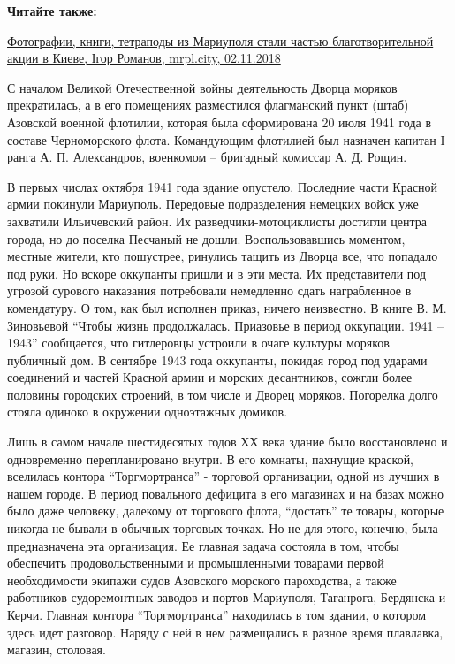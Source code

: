\textbf{Читайте также:} 

\href{https://mrpl.city/news/view/fotografii-knigi-tetrapody-iz-mariupolya-stali-chastyu-blagotvoritelnoj-aktsii-v-kieve-foto}{%
Фотографии, книги, тетраподы из Мариуполя стали частью благотворительной акции в Киеве, Ігор Романов, mrpl.city, 02.11.2018}

С началом Великой Отечественной войны деятельность Дворца моряков
прекратилась, а в его помещениях разместился флагманский пункт (штаб) Азовской
военной флотилии, которая была сформирована 20 июля 1941 года в составе
Черноморского флота. Командующим флотилией был назначен капитан I ранга А. П.
Александров, военкомом – бригадный комиссар А. Д. Рощин.

В первых числах октября 1941 года здание опустело. Последние части Красной
армии покинули Мариуполь. Передовые подразделения немецких войск уже захватили
Ильичевский район. Их разведчики-мотоциклисты достигли центра города, но до
поселка Песчаный не дошли. Воспользовавшись моментом, местные жители, кто
пошустрее, ринулись тащить из Дворца все, что попадало под руки. Но вскоре
оккупанты пришли и в эти места. Их представители под угрозой сурового наказания
потребовали немедленно сдать награбленное в комендатуру. О том, как был
исполнен приказ, ничего неизвестно. В книге В. М. Зиновьевой \enquote{Чтобы жизнь
продолжалась. Приазовье в период оккупации. 1941 – 1943} сообщается, что
гитлеровцы устроили в очаге культуры моряков публичный дом. В сентябре 1943
года оккупанты, покидая город под ударами соединений и частей Красной армии и
морских десантников, сожгли более половины городских строений, в том числе и
Дворец моряков. Погорелка долго стояла одиноко в окружении одноэтажных домиков.

Лишь в самом начале шестидесятых годов ХХ века здание было восстановлено и
одновременно перепланировано внутри. В его комнаты, пахнущие краской, вселилась
контора \enquote{Торгмортранса} - торговой организации, одной из лучших в нашем городе.
В период повального дефицита в его магазинах и на базах можно было даже
человеку, далекому от торгового флота, \enquote{достать} те товары, которые никогда не
бывали в обычных торговых точках. Но не для этого, конечно, была предназначена
эта организация. Ее главная задача состояла в том, чтобы обеспечить
продовольственными и промышленными товарами первой необходимости экипажи судов
Азовского морского пароходства, а также работников судоремонтных заводов и
портов Мариуполя, Таганрога, Бердянска и Керчи. Главная контора \enquote{Торгмортранса}
находилась в том здании, о котором здесь идет разговор. Наряду с ней в нем
размещались в разное время плавлавка, магазин, столовая.

